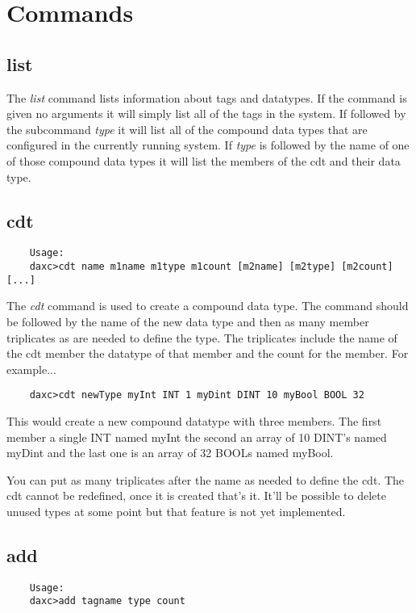 	\section{Commands}

	\subsection{list}
	The \textit{list} command lists information about tags and datatypes.  If the
	command is given no arguments it will simply list all of the tags in the system.
	If followed by the subcommand \textit{type} it will list all of the compound
	data types that are configured in the currently running system.  If
	\textit{type} is followed by the name of one of those compound data types it
	will list the members of the cdt and their data type.

	\subsection{cdt}
	\begin{verbatim}
	Usage:
	daxc>cdt name m1name m1type m1count [m2name] [m2type] [m2count] [...]
	\end{verbatim}
	The \textit{cdt} command is used to create a compound data type.  The command
	should be followed by the name of the new data type and then as many member
	triplicates as are needed to define the type.  The triplicates include the name
	of the cdt member the datatype of that member and the count for the member.  For
	example...

	\begin{verbatim}
	daxc>cdt newType myInt INT 1 myDint DINT 10 myBool BOOL 32
	\end{verbatim}

	This would create a new compound datatype with three members.  The first member
	a single INT named myInt the second an array of 10 DINT's named myDint and the
	last one is an array of 32 BOOLs named myBool.

	You can put as many triplicates after the name as needed to define the cdt.  The
	cdt cannot be redefined, once it is created that's it.  It'll be possible to
	delete unused types at some point but that feature is not yet implemented.

	\subsection{add}
	\begin{verbatim}
	Usage:
	daxc>add tagname type count
	\end{verbatim}

